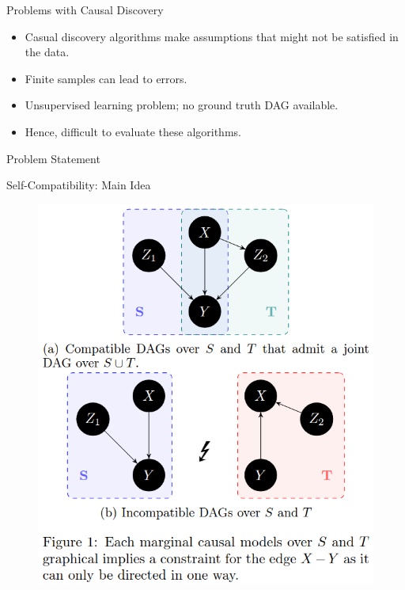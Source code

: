 \documentclass{beamer}
\begin{document}
\begin{frame}{Problems with Causal Discovery}
	\begin{itemize}
		\item Casual discovery algorithms make assumptions that might not be satisfied in the data.
		\item Finite samples can lead to errors.
		\item Unsupervised learning problem; no ground truth DAG available.
		\item Hence, difficult to evaluate these algorithms.
	\end{itemize}
\end{frame}

\begin{frame}{Problem Statement}
\end{frame}

\begin{frame}{Self-Compatibility: Main Idea}
	\begin{figure}
		\centering
		\includegraphics[scale=0.3]{imgs/example.png}
	\end{figure}
\end{frame}
\end{document}
